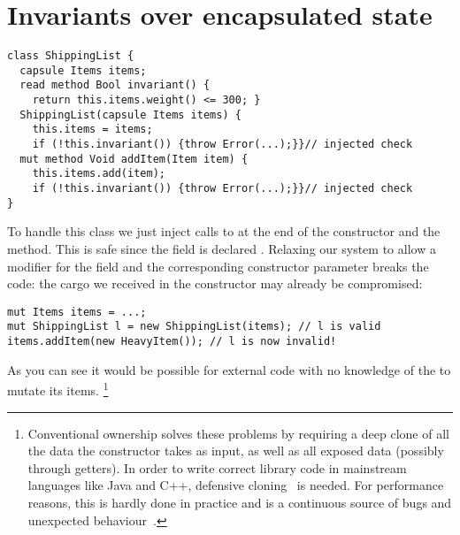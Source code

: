 \section{Invariants over encapsulated state}
\label{s:encapsulated}
\begin{lstlisting}
class ShippingList {
  capsule Items items;
  read method Bool invariant() {
    return this.items.weight() <= 300; }
  ShippingList(capsule Items items) {
    this.items = items;
    if (!this.invariant()) {throw Error(...);}}// injected check
  mut method Void addItem(Item item) {
    this.items.add(item);
    if (!this.invariant()) {throw Error(...);}}// injected check
}
\end{lstlisting}

To handle this class we just inject calls to \Q@invariant@ at the end of the constructor and the \Q@addItem@ method.
This is safe since the \Q@items@ field is declared \Q@capsule@.
Relaxing our system to allow a \Q@mut@ modifier for
the \Q@items@ field and the corresponding constructor parameter 
breaks the code:
the cargo we received in the constructor may already be compromised:
\begin{lstlisting}
mut Items items = ...;
mut ShippingList l = new ShippingList(items); // l is valid
items.addItem(new HeavyItem()); // l is now invalid!
\end{lstlisting}

As you can see it would be possible for external code with no knowledge of the \Q@ShippingList@ to mutate its items.%
\footnote{%
Conventional ownership solves these problems by requiring a deep clone of all the data the constructor takes as input, as well as all exposed data (possibly through getters).
In order to write correct library code in mainstream languages like Java and C++, defensive cloning~\cite{Bloch08} is needed.
For performance reasons, this is hardly done in practice and is a continuous source of bugs and unexpected behaviour~\cite{Bloch08}.}


